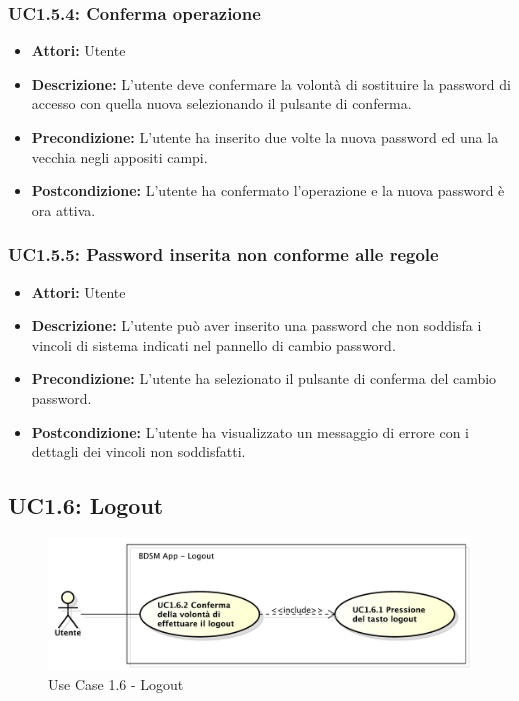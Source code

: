 \subsubsection{UC1.5.4: Conferma operazione}

\begin{itemize}
    \item \textbf{Attori:} Utente
    \item \textbf{Descrizione:} L'utente deve confermare la volontà di sostituire la password di accesso con quella nuova selezionando il pulsante di conferma.
    \item \textbf{Precondizione:} L'utente ha inserito due volte la nuova password ed una la vecchia negli appositi campi.
    \item \textbf{Postcondizione:} L'utente ha confermato l'operazione e la nuova password è ora attiva.
\end{itemize}

\subsubsection{UC1.5.5: Password inserita non conforme alle regole}

\begin{itemize}
    \item \textbf{Attori:} Utente
    \item \textbf{Descrizione:} L'utente può aver inserito una password che non soddisfa i vincoli di sistema indicati nel pannello di cambio password.
    \item \textbf{Precondizione:} L'utente ha selezionato il pulsante di conferma del cambio password.
    \item \textbf{Postcondizione:} L'utente ha visualizzato un messaggio di errore con i dettagli dei vincoli non soddisfatti.
\end{itemize}

\clearpage


\subsection{UC1.6: Logout}

\begin{figure}[htbp]
    \centering
    \centerline{\includegraphics[scale=0.5]{./images/UC1_6.pdf}}
    \caption{Use Case 1.6 - Logout}
\end{figure}

